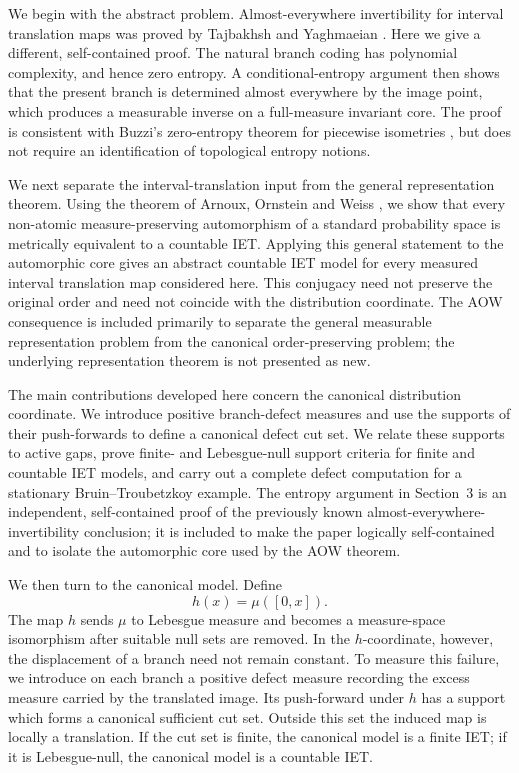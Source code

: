 \documentclass[11pt]{amsart}
\theoremstyle{plain}
\theoremstyle{definition}
\theoremstyle{remark}
\begin{document}
We begin with the abstract problem. Almost-everywhere invertibility for interval translation
maps was proved by Tajbakhsh and Yaghmaeian \cite{TajbakhshYaghmaeian2025}. Here we give a
different, self-contained proof. The natural branch coding has polynomial complexity, and
hence zero entropy. A conditional-entropy argument then shows that the present branch is
determined almost everywhere by the image point, which produces a measurable inverse on a
full-measure invariant core. The proof is consistent with Buzzi's zero-entropy theorem for
piecewise isometries \cite{Buzzi2001}, but does not require an identification of topological
entropy notions.

We next separate the interval-translation input from the general representation theorem.
Using the theorem of Arnoux, Ornstein and Weiss \cite{ArnouxOrnsteinWeiss1985}, we show that
every non-atomic measure-preserving automorphism of a standard probability space is
metrically equivalent to a countable IET. Applying this general
statement to the automorphic core gives an abstract countable IET model for
every measured interval translation map considered here. This conjugacy need not preserve the
original order and need not coincide with the distribution coordinate. The AOW consequence is
included primarily to separate the general measurable representation problem from the
canonical order-preserving problem; the underlying representation theorem is not presented as
new.

The main contributions developed here concern the canonical distribution coordinate. We
introduce positive branch-defect measures and use the supports of their push-forwards to define
a canonical defect cut set. We relate these supports to active gaps, prove finite- and
Lebesgue-null support criteria for finite and countable IET models, and carry out a complete
defect computation for a stationary Bruin--Troubetzkoy example. The entropy argument in
Section~3 is an independent, self-contained proof of the previously known
almost-everywhere-invertibility conclusion; it is included to make the paper logically
self-contained and to isolate the automorphic core used by the AOW theorem.

We then turn to the canonical model. Define
\[
        h(x)=\mu([0,x]).
\]
The map \(h\) sends \(\mu\) to Lebesgue measure and becomes a measure-space isomorphism
after suitable null sets are removed. In the \(h\)-coordinate, however, the displacement of a
branch need not remain constant. To measure this failure, we introduce on each branch a positive
defect measure recording the excess measure carried by the translated image. Its push-forward
under \(h\) has a support which forms a canonical sufficient cut set. Outside this set the induced
map is locally a translation. If the cut set is finite, the canonical model is a finite IET; if it
is Lebesgue-null, the canonical model is a countable IET.
\end{document}
